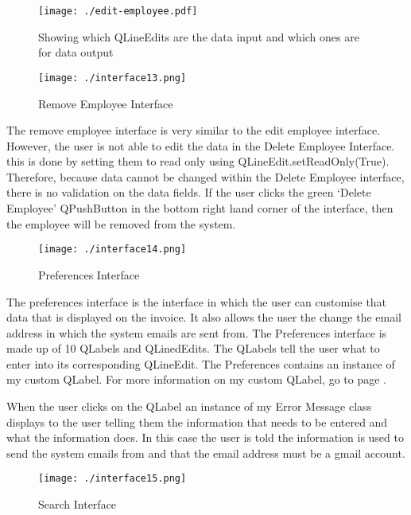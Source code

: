 \begin{figure}[H]
    \texttt{[image: ./edit-employee.pdf]}
    \caption{Showing which QLineEdits are the data input and which ones are for data output} \label{fig:edit-employee-diagram}
\end{figure}

\begin{figure}[H]
    \texttt{[image: ./interface13.png]}
    \caption{Remove Employee Interface} \label{fig:removing-employee-interface}
\end{figure}

The remove employee interface is very similar to the edit employee interface. However, the user is not able to edit the data in the Delete Employee Interface. this is done by setting them to read only using QLineEdit.setReadOnly(True). Therefore, because data cannot be changed within the Delete Employee interface, there is no validation on the data fields. If the user clicks the green `Delete Employee' QPushButton in the bottom right hand corner of the interface, then the employee will be removed from the system.


\begin{figure}[H]
    \texttt{[image: ./interface14.png]}
    \caption{Preferences Interface} \label{fig:preferences-interface}
\end{figure}

The preferences interface is the interface in which the user can customise that data that is displayed on the invoice. It also allows the user the change the email address in which the system emails are sent from. The Preferences interface is made up of 10 QLabels and QLinedEdits. The QLabels tell the user what to enter into its corresponding QLineEdit. The Preferences contains an instance of my custom QLabel. For more information on my custom QLabel, go to page \pageref{fig:custom-label}. 

When the user clicks on the QLabel an instance of my Error Message class displays to the user telling them the information that needs to be entered and what the information does. In this case the user is told the information is used to send the system emails from and that the email address must be a gmail account.

\begin{figure}[H]
    \texttt{[image: ./interface15.png]}
    \caption{Search Interface} \label{fig:search-interface}
\end{figure}

